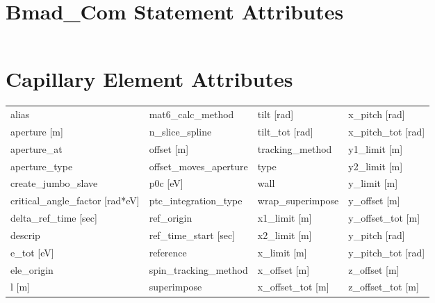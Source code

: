  \section{Bmad_Com Statement Attributes}
 \label{s:list.bmad.com}
 
 \begin{tabular}{llll} \toprule
 \bottomrule
 \end{tabular}
 \vfill
 
 \section{Capillary Element Attributes}
 \label{s:list.capillary}
 
 \begin{tabular}{llll} \toprule
alias                            & mat6_calc_method                 & tilt [rad]                       & x_pitch [rad]                    \\
aperture [m]                     & n_slice_spline                   & tilt_tot [rad]                   & x_pitch_tot [rad]                \\
aperture_at                      & offset [m]                       & tracking_method                  & y1_limit [m]                     \\
aperture_type                    & offset_moves_aperture            & type                             & y2_limit [m]                     \\
create_jumbo_slave               & p0c [eV]                         & wall                             & y_limit [m]                      \\
critical_angle_factor [rad*eV]   & ptc_integration_type             & wrap_superimpose                 & y_offset [m]                     \\
delta_ref_time [sec]             & ref_origin                       & x1_limit [m]                     & y_offset_tot [m]                 \\
descrip                          & ref_time_start [sec]             & x2_limit [m]                     & y_pitch [rad]                    \\
e_tot [eV]                       & reference                        & x_limit [m]                      & y_pitch_tot [rad]                \\
ele_origin                       & spin_tracking_method             & x_offset [m]                     & z_offset [m]                     \\
l [m]                            & superimpose                      & x_offset_tot [m]                 & z_offset_tot [m]                 \\
 \bottomrule
 \end{tabular}
 \vfill
 
